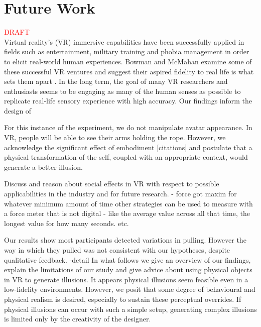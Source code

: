 \section{Future Work}
\textcolor{red}{DRAFT}\\

Virtual reality's (VR) immersive capabilities have been successfully applied in fields such as entertainment, military training and phobia management in order to elicit real-world human experiences. Bowman and McMahan examine some of these successful VR ventures and suggest their aspired fidelity to real life is what sets them apart \cite{bowman2007virtual}. In the long term, the goal of many VR researchers and enthusiasts seems to be engaging as many of the human senses as possible to replicate real-life sensory experience with high accuracy. Our findings inform the design of 

For this instance of the experiment, we do not manipulate avatar appearance. In VR, people will be able to see their arms holding the rope. However, we acknowledge the significant effect of embodiment [citations] and postulate that a physical transformation of the self, coupled with an appropriate context, would generate a better illusion.

Discuss and reason about social effects in VR with respect to possible applicabilities in
the industry and for future research.
- force got maxim for whatever minimum amount of time other strategies can be used to measure with a force meter that is not digital - like the average value across all that time, the longest value for how many seconds. etc.

Our results show most participants detected variations in pulling. However the way in which they pulled was not consistent with our hypotheses, despite qualitative feedback. -detail In what follows we give an overview of our findings, explain the limitations of our study and give advice about using physical objects in VR to generate illusions. It appears physical illusions seem feasible even in a low-fidelity environments. However, we posit that some degree of behavioural and physical realism is desired, especially to sustain these perceptual overrides. If physical illusions can occur with such a simple setup, generating complex illusions is limited only by the creativity of the designer.
\\